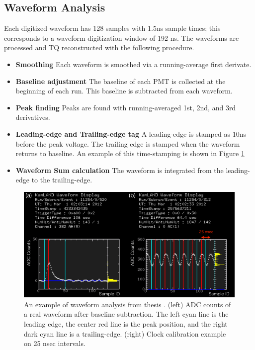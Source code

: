 \subsection{Waveform Analysis}
Each digitized waveform has 128 samples with 1.5ns sample times; this corresponds to a waveform digitization window of 192 ns. The waveforms are processed and TQ reconstructed with the following procedure.
\begin{itemize}
	\item \textbf{Smoothing} Each waveform is smoothed via a running-average first derivate.
	\item \textbf{Baseline adjustment} The baseline of each PMT is collected at the beginning of each run. This baseline is subtracted from each waveform.
	\item \textbf{Peak finding} Peaks are found with running-averaged 1st, 2nd, and 3rd derivatives.
	\item \textbf{Leading-edge and Trailing-edge tag} A leading-edge is stamped as 10ns before the peak voltage. The trailing edge is stamped when the waveform returns to baseline. An example of this time-stamping is shown in Figure \ref{fig:waveform_analysis}
	\item \textbf{Waveform Sum calculation} The waveform is integrated from the leading-edge to the trailing-edge.
\end{itemize}

\begin{figure}[htb]
	\centering
	\includegraphics[scale=0.5]{waveform_analysis.png}
	\caption{An example of waveform analysis from thesis \cite{yoshida_phd}. (left) ADC counts of a real waveform after baseline subtraction. The left cyan line is the leading edge, the center red line is the peak position, and the right dark cyan line is a trailing-edge. (right) Clock calibration example on 25 nsec intervals.}
	\label{fig:waveform_analysis}
\end{figure}

